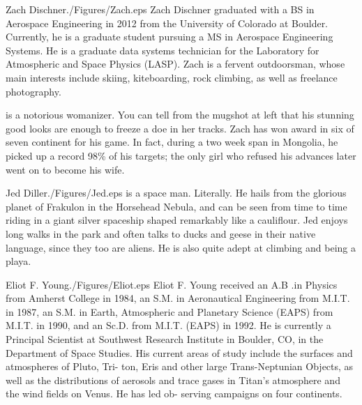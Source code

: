 \documentclass[twocolumn,letterpaper]{IEEEAerospace2012}
\newcommand{\rootdir}{./Figures/}
\begin{document}
\begin{biographywithpic}{Zach Dischner}{\rootdir Zach.eps}
Zach Dischner graduated with a BS in Aerospace Engineering in 2012 from the University of Colorado at Boulder. Currently, he is a graduate student pursuing a MS in Aerospace Engineering Systems. He is a graduate data systems technician for the Laboratory for Atmospheric and Space Physics (LASP). Zach is a fervent outdoorsman, whose main interests include skiing, kiteboarding, rock climbing, as well as freelance photography.

is a notorious womanizer. You can tell from the mugshot at left that his stunning good looks are enough to freeze a doe in her tracks. Zach has won award in six of seven continent for his game. In fact, during a two week span in Mongolia, he picked up a record 98\% of his targets; the only girl who refused his advances later went on to become his wife.
\end{biographywithpic}

\begin{biographywithpic}{Jed Diller}{\rootdir Jed.eps}
is a space man. Literally. He hails from the glorious planet of Frakulon in the Horsehead Nebula, and can be seen from time to time riding in a giant silver spaceship shaped remarkably like a cauliflour. Jed enjoys long walks in the park and often talks to ducks and geese in their native language, since they too are aliens. He is also quite adept at climbing and being a playa.
\end{biographywithpic}

\begin{biographywithpic}{Eliot F. Young}{\rootdir Eliot.eps}
Eliot F. Young received an A.B .in
Physics from Amherst College in 1984,
an S.M. in Aeronautical Engineering
from M.I.T. in 1987, an S.M. in Earth,
Atmospheric and Planetary Science
(EAPS) from M.I.T. in 1990, and an
Sc.D. from M.I.T. (EAPS) in 1992. He is
currently a Principal Scientist at
Southwest Research Institute in Boulder,
CO, in the Department of Space Studies. His current areas
of study include the surfaces and atmospheres of Pluto, Tri-
ton, Eris and other large Trans-Neptunian Objects, as well
as the distributions of aerosols and trace gases in Titan's
atmosphere and the wind fields on Venus. He has led ob-
serving campaigns on four continents.
\end{biographywithpic}
\end{document}
